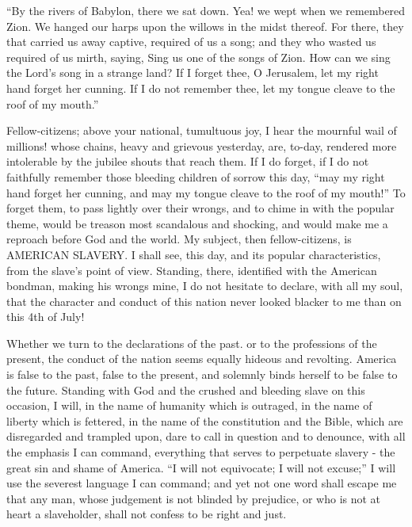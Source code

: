 “By the rivers of Babylon, there we sat down. Yea! we wept when we remembered Zion. We hanged our harps upon the willows in the midst thereof. For there, they that carried us away captive, required of us a song; and they who wasted us required of us mirth, saying, Sing us one of the songs of Zion. How can we sing the Lord’s song in a strange land? If I forget thee, O Jerusalem, let my right hand forget her cunning. If I do not remember thee, let my tongue cleave to the roof of my mouth.”\par

Fellow-citizens; above your national, tumultuous joy, I hear the mournful wail of millions! whose chains, heavy and grievous yesterday, are, to-day, rendered more intolerable by the jubilee shouts that reach them. If I do forget, if I do not faithfully remember those bleeding children of sorrow this day, “may my right hand forget her cunning, and may my tongue cleave to the roof of my mouth!” To forget them, to pass lightly over their wrongs, and to chime in with the popular theme, would be treason most scandalous and shocking, and would make me a reproach before God and the world. My subject, then fellow-citizens, is AMERICAN SLAVERY. I shall see, this day, and its popular characteristics, from the slave’s point of view. Standing, there, identified with the American bondman, making his wrongs mine, I do not hesitate to declare, with all my soul, that the character and conduct of this nation never looked blacker to me than on this 4th of July!\par

Whether we turn to the declarations of the past. or to the professions of the present, the conduct of the nation seems equally hideous and revolting. America is false to the past, false to the present, and solemnly binds herself to be false to the future. Standing with God and the crushed and bleeding slave on this occasion, I will, in the name of humanity which is outraged, in the name of liberty which is fettered, in the name of the constitution and the Bible, which are disregarded and trampled upon, dare to call in question and to denounce, with all the emphasis I can command, everything that serves to perpetuate slavery - the great sin and shame of America. “I will not equivocate; I will not excuse;” I will use the severest language I can command; and yet not one word shall escape me that any man, whose judgement is not blinded by prejudice, or who is not at heart a slaveholder, shall not confess to be right and just.\par

